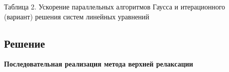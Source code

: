 \documentclass[bachelor, och, referat]{SCWorks}
\begin{document}
Таблица 2. Ускорение параллельных алгоритмов Гаусса и итерационного (вариант) решения систем линейных уравнений

\begin{figure}[h]
\end{figure}


\newpage

\subsection{Решение}
\textbf{Последовательная реализация метода верхней релаксации} 

\begin{figure}[h]
\end{figure}

\begin{figure}[h]
\end{figure}
\end{document}
